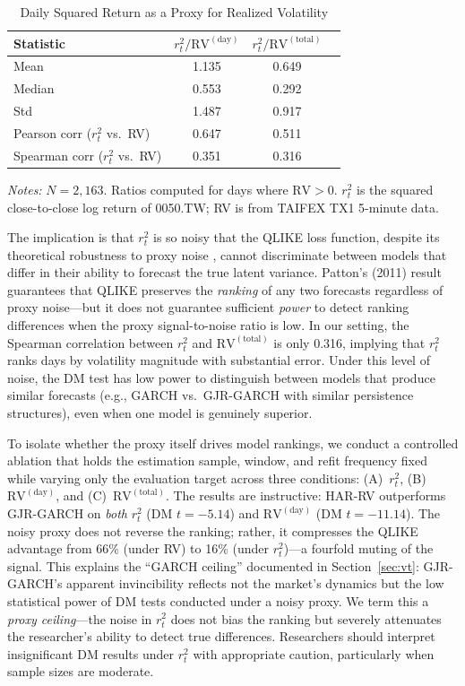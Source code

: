\begin{table}[H]
\centering
\caption{Daily Squared Return as a Proxy for Realized Volatility}
\label{tab:proxy_ratio}
\begin{tabular}{lccc}
\toprule
Statistic & $r_t^2 / \text{RV}^{(\text{day})}$ & $r_t^2 / \text{RV}^{(\text{total})}$ \\
\midrule
Mean & 1.135 & 0.649 \\
Median & 0.553 & 0.292 \\
Std & 1.487 & 0.917 \\
Pearson corr ($r_t^2$ vs.\ RV) & 0.647 & 0.511 \\
Spearman corr ($r_t^2$ vs.\ RV) & 0.351 & 0.316 \\
\bottomrule
\end{tabular}
\begin{flushleft}
\small \textit{Notes:} $N = 2{,}163$. Ratios computed for days where $\text{RV} > 0$. $r_t^2$ is the squared close-to-close log return of 0050.TW; RV is from TAIFEX TX1 5-minute data.
\end{flushleft}
\end{table}

The implication is that $r_t^2$ is so noisy that the QLIKE loss function, despite its theoretical robustness to proxy noise \citep{patton2011}, cannot discriminate between models that differ in their ability to forecast the true latent variance. Patton's (2011) result guarantees that QLIKE preserves the \textit{ranking} of any two forecasts regardless of proxy noise---but it does not guarantee sufficient \textit{power} to detect ranking differences when the proxy signal-to-noise ratio is low. In our setting, the Spearman correlation between $r_t^2$ and $\text{RV}^{(\text{total})}$ is only 0.316, implying that $r_t^2$ ranks days by volatility magnitude with substantial error. Under this level of noise, the DM test has low power to distinguish between models that produce similar forecasts (e.g., GARCH vs.\ GJR-GARCH with similar persistence structures), even when one model is genuinely superior.

To isolate whether the proxy itself drives model rankings, we conduct a controlled ablation that holds the estimation sample, window, and refit frequency fixed while varying only the evaluation target across three conditions: (A)~$r_t^2$, (B)~$\text{RV}^{(\text{day})}$, and (C)~$\text{RV}^{(\text{total})}$. The results are instructive: HAR-RV outperforms GJR-GARCH on \textit{both} $r_t^2$ (DM $t = -5.14$) and $\text{RV}^{(\text{day})}$ (DM $t = -11.14$). The noisy proxy does not reverse the ranking; rather, it compresses the QLIKE advantage from 66\% (under RV) to 16\% (under $r_t^2$)---a fourfold muting of the signal. This explains the ``GARCH ceiling'' documented in Section~\ref{sec:vt}: GJR-GARCH's apparent invincibility reflects not the market's dynamics but the low statistical power of DM tests conducted under a noisy proxy. We term this a \textit{proxy ceiling}---the noise in $r_t^2$ does not bias the ranking but severely attenuates the researcher's ability to detect true differences. Researchers should interpret insignificant DM results under $r_t^2$ with appropriate caution, particularly when sample sizes are moderate.


